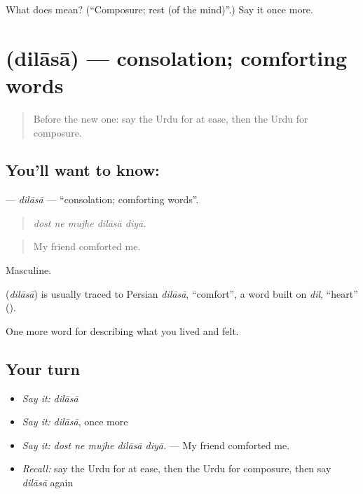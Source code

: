 \begin{tcolorbox}[breakable,colback=teal!4,colframe=teal!35!black,title={Before you move on}]
What does  mean? (\textquotedblleft{}Composure; rest (of the mind)\textquotedblright{}.) Say it once more.
\end{tcolorbox}
\section[\texorpdfstring{\ur{دلاسا} (dilāsā)}{دلاسا (dilāsā)}]{ (dilāsā) — consolation; comforting words}

\label{lesson:UR-C447-dilasa}



\begin{quote}
Before the new one: say the Urdu for at ease, then the Urdu for composure.
\end{quote}

\subsection*{You'll want to know: }
\textbf{} — \emph{dilāsā} — \textquotedblleft{}consolation; comforting words\textquotedblright{}.

\begin{quote}
    
\end{quote}

\begin{quote}
\emph{dost ne mujhe dilāsā diyā.}
\end{quote}

\begin{quote}
My friend comforted me.
\end{quote}

Masculine.

\begin{cousinweb}
\textbf{} (\emph{dilāsā}) is usually traced to Persian \emph{dilāsā}, \textquotedblleft{}comfort\textquotedblright{}, a word built on \emph{dil}, \textquotedblleft{}heart\textquotedblright{} (\textbf{}).
\end{cousinweb}

\begin{grammarlens}[title={What you've built}]
One more word for describing what you lived and felt.
\end{grammarlens}

\subsection*{Your turn}
\begin{itemize}
\raggedright
  \item \emph{Say it:} \emph{dilāsā}
  \item \emph{Say it:} \emph{dilāsā}, once more
  \item \emph{Say it:} \emph{dost ne mujhe dilāsā diyā.} — My friend comforted me.
  \item \emph{Recall:} say the Urdu for at ease, then the Urdu for composure, then say \emph{dilāsā} again
\end{itemize}

